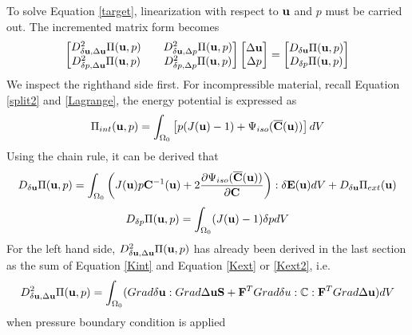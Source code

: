 To solve Equation \ref{target}, linearization with respect to $\bold{u}$ and $p$ must be carried out. The incremented matrix form becomes
\begin{equation} \label{linear}
\begin{bmatrix}
D_{\delta\bold{u}, \Delta\bold{u}}^2 \Pi(\bold{u}, p)  && D_{\delta\bold{u}, \Delta{p}}^2 \Pi(\bold{u}, p)  \\ D_{\delta{p}, \Delta\bold{u}}^2 \Pi(\bold{u}, p)  && D_{\delta{p}, \Delta{p}}^2 \Pi(\bold{u}, p) 
\end{bmatrix}
\begin{bmatrix}
\Delta\bold{u} \\ \Delta{p}
\end{bmatrix}
= 
\begin{bmatrix}
D_{\delta\bold{u}}\Pi(\bold{u}, p) \\ D_{\delta{p}}\Pi(\bold{u}, p) 
\end{bmatrix}
\end{equation}
We inspect the righthand side first. For incompressible material, recall Equation \ref{split2} and \ref{Lagrange}, the energy potential is expressed as
\begin{equation} \label{split3}
\Pi_{int}(\bold{u}, p) = \int_{\Omega_0} \left[ p(J(\bold{u}) - 1) + \Psi_{iso}(\overline{\bold{C}}(\bold{u}))\right] dV
\end{equation}
Using the chain rule, it can be derived that
\begin{equation}\label{rhs1}
D_{\delta\bold{u}}\Pi(\bold{u}, p) = \int_{\Omega_0}\left( J(\bold{u})p\bold{C}^{-1}(\bold{u}) + 
2\frac{\partial{\Psi_{iso}(\overline{\bold{C}}(\bold{u}))}}{\partial{\bold{C}}}  \right) : \delta\bold{E}(\bold{u}) dV + D_{\delta\bold{u}}\Pi_{ext}(\bold{u})
\end{equation}
\begin{equation}\label{rhs2}
D_{\delta{p}}\Pi(\bold{u}, p) = \int_{\Omega_0} (J(\bold{u}) - 1 )\delta{p} dV
\end{equation}
For the left hand side, $D_{\delta\bold{u}, \Delta\bold{u}}^2 \Pi(\bold{u}, p)$ has already been derived in the last section as the sum of Equation \ref{Kint} and Equation \ref{Kext} or \ref{Kext2}, i.e.
\begin{equation} \label{lhs0}
D_{\delta\bold{u}, \Delta\bold{u}}^2 \Pi(\bold{u}, p) =  \int_{\Omega_0}(Grad\delta\bold{u} : Grad\Delta\bold{u}\bold{S} + \bold{F}^TGrad\delta{u} : \mathbb{C} : \bold{F}^T Grad\Delta\bold{u})dV  \end{equation}
when pressure boundary condition is applied
